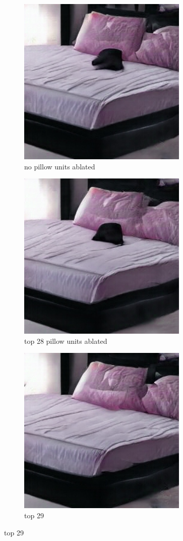 \documentclass{article}
\begin{document}
\begin{figure}[H]
    \centering
    \begin{subfigure}{.3\textwidth}
        \caption{no pillow units ablated}
        \includegraphics[scale=0.28]{images/black_pillow_no_ablate.png}
    \end{subfigure}
    \begin{subfigure}{.3\textwidth}
        \caption{top 28 pillow units ablated}
        \includegraphics[scale=0.28]{images/black_pillow_top28.png}
    \end{subfigure}
    \begin{subfigure}{.3\textwidth}
        \caption{top 29}
        \includegraphics[scale=0.28]{images/black_pillow_top29.png}
    \end{subfigure}
\end{figure}
\end{document}

